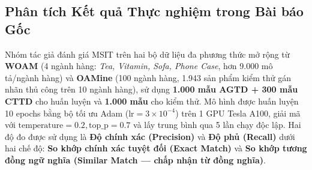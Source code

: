 \documentclass[conference,10pt]{IEEEtran}
\begin{document}
\subsection{Phân tích Kết quả Thực nghiệm trong Bài báo Gốc}

Nhóm tác giả đánh giá MSIT trên hai bộ dữ liệu đa phương thức mở rộng từ \textbf{WOAM} (4 ngành hàng: \textit{Tea, Vitamin, Sofa, Phone Case}, hơn 9.000 mô tả/ngành hàng) và \textbf{OAMine} (100 ngành hàng, 1.943 sản phẩm kiểm thử gán nhãn thủ công trên 10 ngành hàng), sử dụng \textbf{1.000 mẫu AGTD + 300 mẫu CTTD} cho huấn luyện và \textbf{1.000 mẫu} cho kiểm thử. Mô hình được huấn luyện 10 epochs bằng bộ tối ưu Adam ($\text{lr} = 3 \times 10^{-4}$) trên 1 GPU Tesla A100, giải mã với $\text{temperature} = 0.2, \text{top\_p} = 0.7$ và lấy trung bình qua 5 lần chạy độc lập. Hai độ đo được sử dụng là \textbf{Độ chính xác (Precision)} và \textbf{Độ phủ (Recall)} dưới hai chế độ: \textbf{So khớp chính xác tuyệt đối (Exact Match)} và \textbf{So khớp tương đồng ngữ nghĩa (Similar Match --- chấp nhận từ đồng nghĩa)}.
\end{document}
